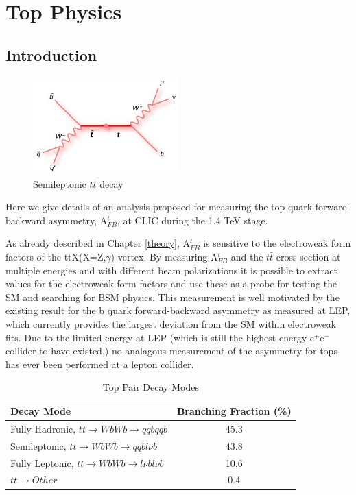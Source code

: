 \chapter{Top Physics}
\label{chapter:topanalysis}
\section{Introduction}

\begin{figure}
  \centering
  \includegraphics[width=0.5\textwidth]{TopAnalysis/figures/TopFeynmann.jpg}
  \caption[Semileptonic $t\bar{t}$ decay]{Semileptonic $t\bar{t}$ decay}
  \label{fig:topfeynmann}
\end{figure}

Here we give details of an analysis proposed for measuring the top quark forward-backward asymmetry, A$_{FB}^t$, at CLIC during the 1.4 TeV stage. 

As already described in Chapter \ref{theory}, A$_{FB}^t$ is sensitive to the electroweak form factors of the ttX(X=Z,$\gamma$) vertex. By measuring A$_{FB}^t$ and the $t\bar{t}$ cross section at multiple energies and with different beam polarizations it is possible to extract values for the electroweak form factors and use these as a probe for testing the \ac{SM} and searching for \ac{BSM} physics. This measurement is well motivated by the existing result for the b quark forward-backward asymmetry as measured at \ac{LEP}, which currently provides the largest deviation from the \ac{SM} within electroweak fits. Due to the limited energy at \ac{LEP} (which is still the highest energy e$^+$e$^-$ collider to have existed,) no analagous measurement of the asymmetry for tops has ever been performed at a lepton collider. 

\begin{table}
  \centering
  \begin{tabular}{l |c}
    \toprule
    Decay Mode     & Branching Fraction (\%) \\
    \midrule
    Fully Hadronic, $tt\rightarrow WbWb\rightarrow qqbqqb$ & 45.3  \\
    \midrule
    Semileptonic, $tt\rightarrow WbWb\rightarrow qqbl\nu b$ & 43.8 \\
    \midrule
    Fully Leptonic, $tt\rightarrow WbWb\rightarrow l\nu bl\nu b$ & 10.6 \\
    \midrule
    $tt\rightarrow Other$ & 0.4 \\
    \bottomrule
  \end{tabular}
  \caption{Top Pair Decay Modes}
  \label{table:topdecaymodes}
\end{table}

